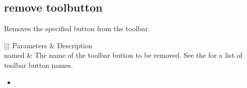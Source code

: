 \documentclass[letterpaper,12pt,english,openany,oneside]{sphinxmanual}
\begin{document}
\subsection{remove toolbutton}
\label{\detokenize{IAC_API_AppleEvtObjects:remove-toolbutton}}
Removes the specified button from the toolbar.

\label{\detokenize{IAC_API_AppleEvtObjects:syntax-34}}

\begin{sphinxVerbatim}[commandchars=\\\{\}]
  
 \PYG{p}{[} \PYG{p}{]}
\end{sphinxVerbatim}
\label{\detokenize{IAC_API_AppleEvtObjects:parameters-35}}


\begin{savenotes}\sphinxattablestart
\centering
{}\label{\detokenize{IAC_API_AppleEvtObjects:section-50}}\nobreak
\begin{tabular}[t]{|||}
\hline
\sphinxstyletheadfamily 
Parameters
&\sphinxstyletheadfamily 
Description
\\
\hline
named
&
The name of the toolbar button to be removed. See the  for a list of toolbar button names.
\\
\hline
\end{tabular}
\par
\sphinxattableend\end{savenotes}
\label{\detokenize{IAC_API_AppleEvtObjects:related-events-22}}
\begin{itemize}
\item {} 

\end{itemize}
\label{\detokenize{IAC_API_AppleEvtObjects:applescript-example-31}}

\begin{sphinxVerbatim}[commandchars=\\\{\}]
   
\end{sphinxVerbatim}
\label{\detokenize{IAC_API_AppleEvtObjects:apple-event-id-22}}
\end{document}
